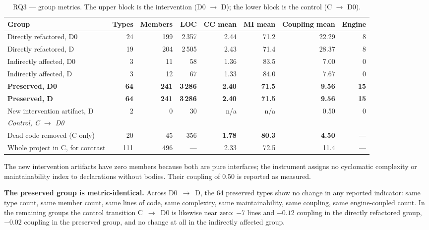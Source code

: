 \documentclass{sbc2019}%
\begin{document}
\begin{table}[t]
\centering
\caption{RQ3 --- group metrics. The upper block is the intervention
(D0 $\rightarrow$ D); the lower block is the control (C $\rightarrow$ D0).}\label{tab:rq3metrics}
\small
\begin{tabular}{lrrrrrrr}
\toprule
\textbf{Group} & \textbf{Types} & \textbf{Members} & \textbf{LOC} & \textbf{CC mean} & \textbf{MI mean} & \textbf{Coupling mean} & \textbf{Engine} \\
\midrule
Directly refactored, D0   & 24 & 199 & 2\,357 & 2.44 & 71.2 & 22.29 & 8 \\
Directly refactored, D    & 19 & 204 & 2\,505 & 2.43 & 71.4 & 28.37 & 8 \\
\addlinespace
Indirectly affected, D0   & 3  & 11  & 58    & 1.36 & 83.5 & 7.00  & 0 \\
Indirectly affected, D    & 3  & 12  & 67    & 1.33 & 84.0 & 7.67  & 0 \\
\addlinespace
\textbf{Preserved, D0}    & \textbf{64} & \textbf{241} & \textbf{3\,286} & \textbf{2.40} & \textbf{71.5} & \textbf{9.56} & \textbf{15} \\
\textbf{Preserved, D}     & \textbf{64} & \textbf{241} & \textbf{3\,286} & \textbf{2.40} & \textbf{71.5} & \textbf{9.56} & \textbf{15} \\
\addlinespace
New intervention artifact, D & 2 & 0 & 30 & n/a & n/a & 0.50 & 0 \\
\midrule
\multicolumn{8}{l}{\emph{Control, C $\rightarrow$ D0}} \\
Dead code removed (C only) & 20 & 45  & 356 & \textbf{1.78} & \textbf{80.3} & \textbf{4.50} & --- \\
Whole project in C, for contrast & 111 & 496 & --- & 2.33 & 72.5 & 11.4 & --- \\
\bottomrule
\end{tabular}
\end{table}

The new intervention artifacts have zero members because both are pure
interfaces; the instrument assigns no cyclomatic complexity or maintainability
index to declarations without bodies. Their coupling of 0.50 is reported as
measured.

\medskip\noindent\textbf{The preserved group is metric-identical.} Across
D0~$\rightarrow$~D, the 64 preserved types show no change in any reported
indicator: same type count, same member count, same lines of code, same
complexity, same maintainability, same coupling, same engine-coupled count. In
the remaining groups the control transition C~$\rightarrow$~D0 is likewise near
zero: $-7$ lines and $-0.12$ coupling in the directly refactored group, $-0.02$
coupling in the preserved group, and no change at all in the indirectly affected
group.
\end{document}
